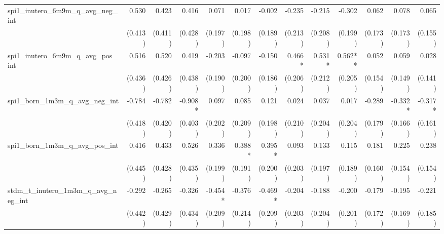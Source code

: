 \begin{tabular}{lrrrrrrrrrrrr}
spi1\_inutero\_6m9m\_q\_avg\_neg\_int       &        0.530 &        0.423 &        0.416 &        0.071 &        0.017 &       -0.002 &       -0.235 &       -0.215 &       -0.302 &        0.062 &        0.078 &        0.065 \\ 
                                            &      (0.413) &      (0.411) &      (0.428) &      (0.197) &      (0.198) &      (0.189) &      (0.213) &      (0.208) &      (0.199) &      (0.173) &      (0.173) &      (0.155) \\ 
spi1\_inutero\_6m9m\_q\_avg\_pos\_int       &        0.516 &        0.520 &        0.419 &       -0.203 &       -0.097 &       -0.150 &       0.466* &       0.531* &      0.562** &        0.052 &        0.059 &        0.028 \\ 
                                            &      (0.436) &      (0.426) &      (0.438) &      (0.190) &      (0.200) &      (0.186) &      (0.206) &      (0.212) &      (0.205) &      (0.154) &      (0.149) &      (0.141) \\ 
spi1\_born\_1m3m\_q\_avg\_neg\_int          &       -0.784 &       -0.782 &      -0.908* &        0.097 &        0.085 &        0.121 &        0.024 &        0.037 &        0.017 &       -0.289 &      -0.332* &      -0.317* \\ 
                                            &      (0.418) &      (0.420) &      (0.403) &      (0.202) &      (0.209) &      (0.198) &      (0.210) &      (0.204) &      (0.204) &      (0.179) &      (0.166) &      (0.161) \\ 
spi1\_born\_1m3m\_q\_avg\_pos\_int          &        0.416 &        0.433 &        0.526 &        0.336 &       0.388* &       0.395* &        0.093 &        0.133 &        0.115 &        0.181 &        0.225 &        0.238 \\ 
                                            &      (0.445) &      (0.428) &      (0.435) &      (0.199) &      (0.191) &      (0.200) &      (0.203) &      (0.197) &      (0.189) &      (0.160) &      (0.154) &      (0.154) \\ 
stdm\_t\_inutero\_1m3m\_q\_avg\_neg\_int    &       -0.292 &       -0.265 &       -0.326 &      -0.454* &       -0.376 &      -0.469* &       -0.204 &       -0.188 &       -0.200 &       -0.179 &       -0.195 &       -0.221 \\ 
                                            &      (0.442) &      (0.429) &      (0.434) &      (0.209) &      (0.214) &      (0.209) &      (0.203) &      (0.204) &      (0.201) &      (0.172) &      (0.169) &      (0.185) \\ 

\end{tabular}
